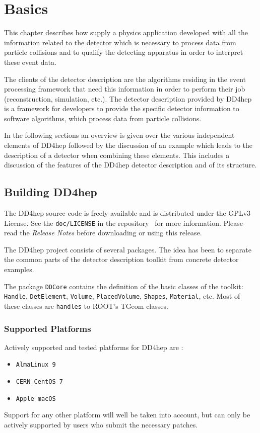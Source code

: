 \chapter{Basics}
\label{sec:dd4hep-user-manual}

This chapter describes how supply a physics application developed with all the information related to the detector which is necessary to process data from particle collisions and to qualify the detecting apparatus in order to interpret these event data.

The clients of the detector description are the algorithms residing in the  event processing framework that need this information in order to perform their job (reconstruction, simulation, etc.). The detector description provided by DD4hep is a framework for developers to provide the specific detector information to software algorithms, which process data from particle collisions.

In the following sections an overview is given over the various independent elements of DD4hep followed by the discussion of an example which leads to  the description of a detector when combining these elements. This includes a discussion of the features of the DD4hep detector description and of its structure. 

\section{Building DD4hep}
\label{sec:dd4hep-user-manual-building}

The DD4hep source code is freely available and is distributed under the GPLv3 License. See the \texttt{doc/LICENSE} in the repository~\cite{dd4hep-repo} for more information. Please read the \textit{Release Notes} before downloading or using this release.

The DD4hep project consists of several packages. The idea  has been to separate the common parts of  the detector description toolkit from concrete detector examples. 

The package {\texttt{DDCore}} contains the definition of the basic classes of the toolkit: \texttt{Handle}, \texttt{DetElement}, \texttt{Volume}, \texttt{PlacedVolume}, \texttt{Shapes}, \texttt{Material}, etc. Most of these classes are \texttt{handles} to ROOT's TGeom classes.

\subsection{Supported Platforms}
\label{sec:dd4hep-user-manual-platforms}
Actively supported and tested platforms for DD4hep are :
\begin{itemize}
\item \texttt{AlmaLinux 9}
\item \texttt{CERN CentOS 7}
\item \texttt{Apple macOS}
\end{itemize}
Support for any other platform will well be taken into account, but can only be actively supported by users who submit the necessary patches.

